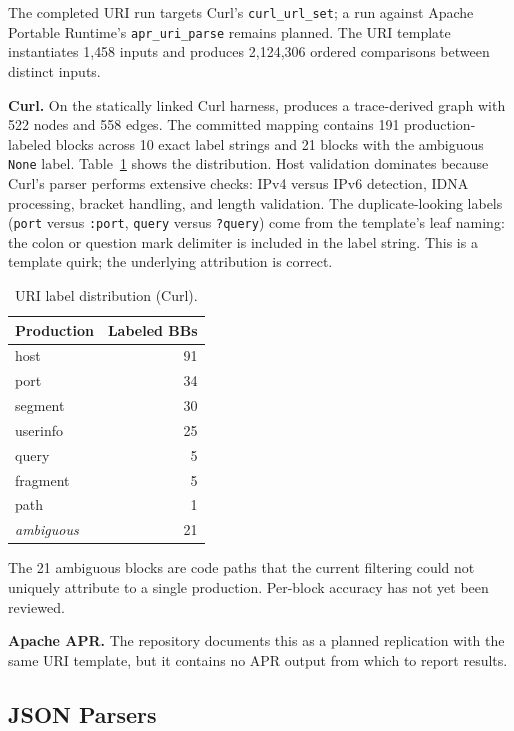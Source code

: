 The completed URI run targets Curl's \texttt{curl\_url\_set}; a run against Apache Portable Runtime's \texttt{apr\_uri\_parse} remains planned.
The URI template instantiates 1{,}458 inputs and produces 2{,}124{,}306 ordered comparisons between distinct inputs.

\textbf{Curl.}
On the statically linked Curl harness, \toolname produces a trace-derived graph with 522 nodes and 558 edges.
The committed mapping contains 191 production-labeled blocks across 10 exact label strings and 21 blocks with the ambiguous \texttt{None} label.
Table~\ref{tab:url-labels} shows the distribution.
Host validation dominates because Curl's parser performs extensive checks: IPv4 versus IPv6 detection, IDNA processing, bracket handling, and length validation.
The duplicate-looking labels (\texttt{port} versus \texttt{:port}, \texttt{query} versus \texttt{?query}) come from the template's leaf naming: the colon or question mark delimiter is included in the label string. This is a template quirk; the underlying attribution is correct.

\begin{table}[h]
\caption{URI label distribution (Curl).}
\label{tab:url-labels}
\centering
\begin{tabular}{lr}
\toprule
Production & Labeled BBs \\
\midrule
host        & 91 \\
port        & 34 \\
segment     & 30 \\
userinfo    & 25 \\
query       & 5  \\
fragment    & 5  \\
path        & 1  \\
\textit{ambiguous} & 21 \\
\bottomrule
\end{tabular}
\end{table}

The 21 ambiguous blocks are code paths that the current filtering could not uniquely attribute to a single production.
Per-block accuracy has not yet been reviewed.

\textbf{Apache APR.}
The repository documents this as a planned replication with the same URI template, but it contains no APR output from which to report results.

\subsection{JSON Parsers}\label{sec:eval:json}

